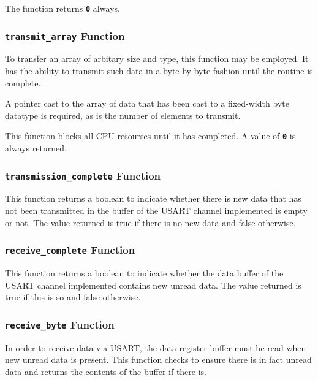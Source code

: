 \documentclass[a4paper, oneside, 11pt, titlepage, onecolumn, openright]{article}
\begin{document}
			The function returns \textbf{\texttt{0}} always.
			
\subsubsection{\textbf{\texttt{transmit\_array}} Function}
			\label{sss:HALusarttransmit_arrayFunction}
			
			To transfer an array of arbitary size and type, this function may be employed. It has the ability to transmit such data in a byte-by-byte fashion until the routine is complete.
			
			A pointer cast to the array of data that has been cast to a fixed-width byte datatype is required, as is the number of elements to transmit.
			
			This function blocks all CPU resourses until it has completed. A value of \textbf{\texttt{0}} is always returned. 
			
\subsubsection{\textbf{\texttt{transmission\_complete}} Function}
			\label{sss:HALusarttransmission_completeFunction}
			
			This function returns a boolean to indicate whether there is new data that has not been transmitted in the buffer of the USART channel implemented is empty or not. The value returned is true if there is no new data and false otherwise.
			
\subsubsection{\textbf{\texttt{receive\_complete}} Function}
			\label{sss:HALusartreceive_completeFunction}
			
			This function returns a boolean to indicate whether the data buffer of the USART channel implemented contains new unread data. The value returned is true if this is so and false otherwise.
			
\subsubsection{\textbf{\texttt{receive\_byte}} Function}
			\label{sss:HALusartreceive_byteFunction}
			
			In order to receive data via USART, the data register buffer must be read when new unread data is present. This function checks to ensure there is in fact unread data and returns the contents of the buffer if there is.
			
\end{document}
